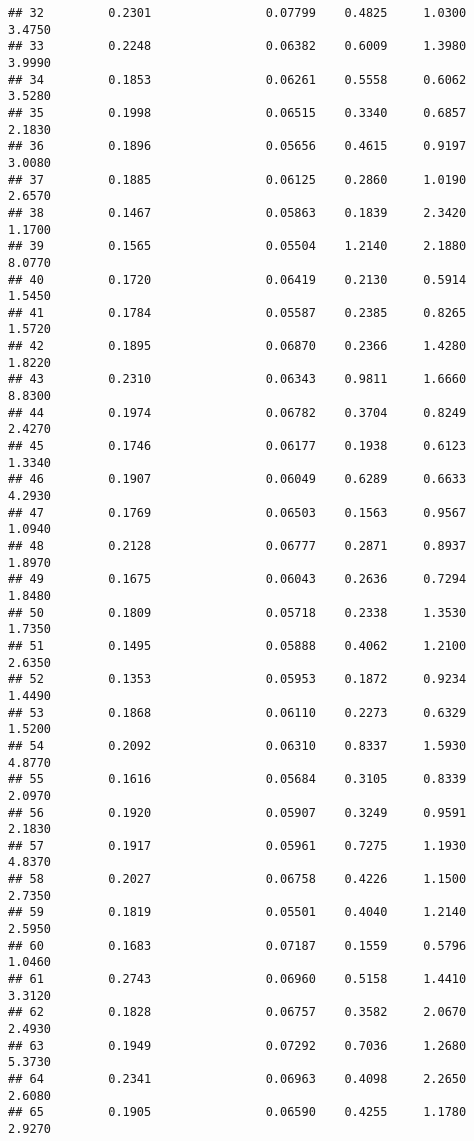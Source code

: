\documentclass[
]{article}
\begin{document}
\begin{verbatim}
## 32         0.2301                0.07799    0.4825     1.0300       3.4750
## 33         0.2248                0.06382    0.6009     1.3980       3.9990
## 34         0.1853                0.06261    0.5558     0.6062       3.5280
## 35         0.1998                0.06515    0.3340     0.6857       2.1830
## 36         0.1896                0.05656    0.4615     0.9197       3.0080
## 37         0.1885                0.06125    0.2860     1.0190       2.6570
## 38         0.1467                0.05863    0.1839     2.3420       1.1700
## 39         0.1565                0.05504    1.2140     2.1880       8.0770
## 40         0.1720                0.06419    0.2130     0.5914       1.5450
## 41         0.1784                0.05587    0.2385     0.8265       1.5720
## 42         0.1895                0.06870    0.2366     1.4280       1.8220
## 43         0.2310                0.06343    0.9811     1.6660       8.8300
## 44         0.1974                0.06782    0.3704     0.8249       2.4270
## 45         0.1746                0.06177    0.1938     0.6123       1.3340
## 46         0.1907                0.06049    0.6289     0.6633       4.2930
## 47         0.1769                0.06503    0.1563     0.9567       1.0940
## 48         0.2128                0.06777    0.2871     0.8937       1.8970
## 49         0.1675                0.06043    0.2636     0.7294       1.8480
## 50         0.1809                0.05718    0.2338     1.3530       1.7350
## 51         0.1495                0.05888    0.4062     1.2100       2.6350
## 52         0.1353                0.05953    0.1872     0.9234       1.4490
## 53         0.1868                0.06110    0.2273     0.6329       1.5200
## 54         0.2092                0.06310    0.8337     1.5930       4.8770
## 55         0.1616                0.05684    0.3105     0.8339       2.0970
## 56         0.1920                0.05907    0.3249     0.9591       2.1830
## 57         0.1917                0.05961    0.7275     1.1930       4.8370
## 58         0.2027                0.06758    0.4226     1.1500       2.7350
## 59         0.1819                0.05501    0.4040     1.2140       2.5950
## 60         0.1683                0.07187    0.1559     0.5796       1.0460
## 61         0.2743                0.06960    0.5158     1.4410       3.3120
## 62         0.1828                0.06757    0.3582     2.0670       2.4930
## 63         0.1949                0.07292    0.7036     1.2680       5.3730
## 64         0.2341                0.06963    0.4098     2.2650       2.6080
## 65         0.1905                0.06590    0.4255     1.1780       2.9270

\end{verbatim}
\end{document}
